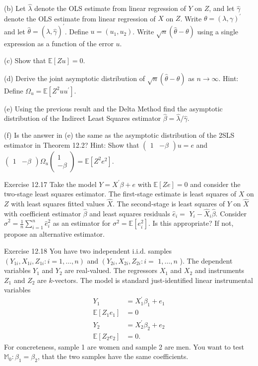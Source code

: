 \documentclass[10pt]{article}
\begin{document}
(b) Let $\widehat{\lambda}$ denote the OLS estimate from linear regression of $Y$ on $Z$, and let $\widehat{\gamma}$ denote the OLS estimate from linear regression of $X$ on $Z$. Write $\theta=(\lambda, \gamma)^{\prime}$ and let $\widehat{\theta}=(\widehat{\lambda}, \widehat{\gamma})^{\prime}$. Define $u=\left(u_{1}, u_{2}\right)$. Write $\sqrt{n}(\widehat{\theta}-\theta)$ using a single expression as a function of the error $u$.

(c) Show that $\mathbb{E}[Z u]=0$.

(d) Derive the joint asymptotic distribution of $\sqrt{n}(\widehat{\theta}-\theta)$ as $n \rightarrow \infty$. Hint: Define $\Omega_{u}=\mathbb{E}\left[Z^{2} u u^{\prime}\right]$.

(e) Using the previous result and the Delta Method find the asymptotic distribution of the Indirect Least Squares estimator $\widehat{\beta}=\widehat{\lambda} / \widehat{\gamma}$.

(f) Is the answer in (e) the same as the asymptotic distribution of the 2SLS estimator in Theorem 12.2? Hint: Show that $\left(\begin{array}{ll}1 & -\beta\end{array}\right) u=e$ and $\left(\begin{array}{cc}1 & -\beta\end{array}\right) \Omega_{u}\left(\begin{array}{c}1 \\ -\beta\end{array}\right)=\mathbb{E}\left[Z^{2} e^{2}\right]$.

Exercise 12.17 Take the model $Y=X^{\prime} \beta+e$ with $\mathbb{E}[Z e]=0$ and consider the two-stage least squares estimator. The first-stage estimate is least squares of $X$ on $Z$ with least squares fitted values $\widehat{X}$. The second-stage is least squares of $Y$ on $\widehat{X}$ with coefficient estimator $\widehat{\beta}$ and least squares residuals $\widehat{e}_{i}=$ $Y_{i}-\widehat{X}_{i} \widehat{\beta}$. Consider $\widehat{\sigma}^{2}=\frac{1}{n} \sum_{i=1}^{n} \widehat{e}_{i}^{2}$ as an estimator for $\sigma^{2}=\mathbb{E}\left[e_{i}^{2}\right]$. Is this appropriate? If not, propose an alternative estimator.

Exercise 12.18 You have two independent i.i.d. samples $\left(Y_{1 i}, X_{1 i}, Z_{1 i}: i=1, \ldots, n\right)$ and $\left(Y_{2 i}, X_{2 i}, Z_{2 i}: i=\right.$ $1, \ldots, n$ ). The dependent variables $Y_{1}$ and $Y_{2}$ are real-valued. The regressors $X_{1}$ and $X_{2}$ and instruments $Z_{1}$ and $Z_{2}$ are $k$-vectors. The model is standard just-identified linear instrumental variables
$$
\begin{aligned}
Y_{1} &=X_{1}^{\prime} \beta_{1}+e_{1} \\
\mathbb{E}\left[Z_{1} e_{1}\right] &=0 \\
Y_{2} &=X_{2}^{\prime} \beta_{2}+e_{2} \\
\mathbb{E}\left[Z_{2} e_{2}\right] &=0 .
\end{aligned}
$$
For concreteness, sample 1 are women and sample 2 are men. You want to test $\mathbb{M}_{0}: \beta_{1}=\beta_{2}$, that the two samples have the same coefficients.
\end{document}
